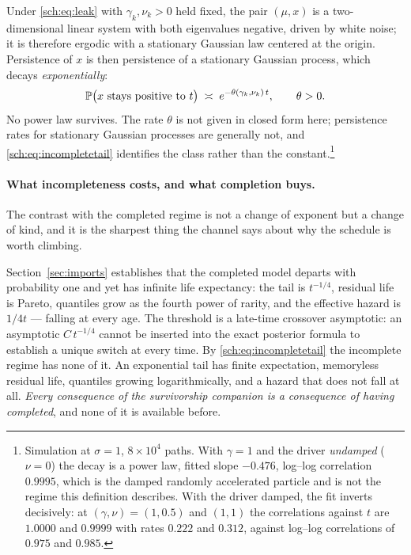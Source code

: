 \begin{proposition}\label{sch:prop:exponent}
Under \eqref{sch:eq:leak} with $\gamma_k,\nu_k>0$ held fixed, the pair
$(\mu,x)$ is a two-dimensional linear system with both eigenvalues
negative, driven by white noise; it is therefore ergodic with a
stationary Gaussian law centered at the origin. Persistence of $x$ is then
persistence of a stationary Gaussian process, which decays
\emph{exponentially}:
\begin{equation}\label{sch:eq:incompletetail}
\mathbb{P}\bigl(x\ \text{stays positive to }t\bigr)\;\asymp\;e^{-\theta(\gamma_k,\nu_k)\,t},
\qquad \theta>0 .
\end{equation}
No power law survives. The rate $\theta$ is not given in closed form
here; persistence rates for stationary Gaussian processes are generally
not, and \eqref{sch:eq:incompletetail} identifies the class rather than
the constant.\footnote{Simulation at $\sigma=1$, $8\times10^{4}$ paths.
With $\gamma=1$ and the driver \emph{undamped} ($\nu=0$) the decay is a
power law, fitted slope $-0.476$, log--log correlation $0.9995$, which is the damped randomly accelerated particle and is not the regime
this definition describes. With the driver damped, the fit inverts
decisively: at $(\gamma,\nu)=(1,0.5)$ and $(1,1)$ the correlations
against $t$ are $1.0000$ and $0.9999$ with rates $0.222$ and $0.312$,
against log--log correlations of $0.975$ and $0.985$.}
\end{proposition}

\paragraph{What incompleteness costs, and what completion buys.}\label{sch:rem:suspends}
The contrast with the completed regime is not a change of exponent but a
change of kind, and it is the sharpest thing the channel says about why
the schedule is worth climbing.

Section~\ref{sec:imports} establishes that the completed model departs with
probability one and yet has infinite life expectancy: the tail is
$t^{-1/4}$, residual life is Pareto, quantiles grow as the fourth power
of rarity, and the effective hazard is $1/4t$ --- falling at every age. The threshold is a late-time crossover asymptotic: an asymptotic $C\,t^{-1/4}$ cannot be inserted into the exact posterior formula to establish a unique switch at every time.
By \eqref{sch:eq:incompletetail} the incomplete regime has none of it.
An exponential tail has finite expectation, memoryless residual life,
quantiles growing logarithmically, and a hazard that does not fall at
all. \emph{Every consequence of the survivorship companion \cite{GoldenSurvivorship} is a
consequence of having completed}, and none of it is available before.

